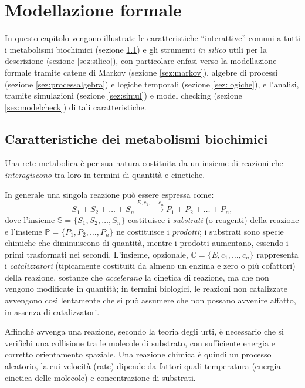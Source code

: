 \chapter{Modellazione formale}\label{cap:modellazione}
	In questo capitolo vengono illustrate le caratteristiche ``interattive'' comuni a tutti i metabolismi biochimici (sezione \ref{sez:caratt}) e gli strumenti \emph{in silico} utili per la descrizione (sezione \ref{sez:silico}), con particolare enfasi verso la modellazione formale tramite catene di Markov (sezione \ref{sez:markov}), algebre di processi (sezione \ref{sez:processalgebra}) e logiche temporali (sezione \ref{sez:logiche}), e l'analisi, tramite simulazioni (sezione \ref{sez:simul}) e model checking (sezione \ref{sez:modelcheck}) di tali caratteristiche.

	\section{Caratteristiche dei metabolismi biochimici}\label{sez:caratt}
		Una rete metabolica \`e per sua natura costituita da un insieme di reazioni che \emph{interagiscono} tra loro in termini di quantit\`a e cinetiche.
		
		In generale una singola reazione pu\`o essere espressa come:
		\begin{equation*}
			S_1 + S_2 + \dots + S_n \xrightarrow{E , c_1, \dots, c_n} P_1 + P_2 + \dots + P_n,
		\end{equation*}
		dove l'insieme $\mathbb{S} = \{S_1, S_2, \dots, S_n\}$ costituisce i \emph{substrati} (o reagenti) della reazione e l'insieme $\mathbb{P} = \{P_1, P_2, \dots, P_n\}$ ne costituisce i \emph{prodotti}; i substrati sono specie chimiche che diminuiscono di quantit\`a, mentre i prodotti aumentano, essendo i primi trasformati nei secondi.
		L'insieme, opzionale, $\mathbb{C} = \{E, c_1, \dots, c_n\}$ rappresenta i \emph{catalizzatori} (tipicamente costituiti da almeno un enzima e zero o pi\`u cofattori) della reazione, sostanze che \emph{accelerano} la cinetica di reazione, ma che non vengono modificate in quantit\`a; in termini biologici, le reazioni non catalizzate avvengono cos\`i lentamente che si pu\`o assumere che non possano avvenire affatto, in assenza di catalizzatori.
		
		Affinch\'e avvenga una reazione, secondo la teoria degli urti, \`e necessario che si verifichi una collisione tra le molecole di substrato, con sufficiente energia e corretto orientamento spaziale.
		Una reazione chimica \`e quindi un processo aleatorio, la cui velocit\`a (rate) dipende da fattori quali temperatura (energia cinetica delle molecole) e concentrazione di substrati.
		
